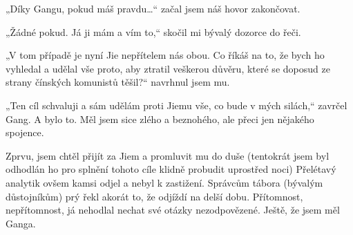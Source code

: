 „Díky Gangu, pokud máš pravdu…“ začal jsem náš hovor zakončovat.

„Žádné pokud. Já ji mám a vím to,“ skočil mi bývalý dozorce do řeči.

„V tom případě je nyní Jie nepřítelem nás obou. Co říkáš na to, že bych ho vyhledal a udělal vše proto, aby ztratil veškerou důvěru, které se doposud ze strany čínských komunistů těšil?“ navrhnul jsem mu.

„Ten cíl schvaluji a sám udělám proti Jiemu vše, co bude v mých silách,“ zavrčel Gang. A bylo to. Měl jsem sice zlého a beznohého, ale přeci jen nějakého spojence.

Zprvu, jsem chtěl přijít za Jiem a promluvit mu do duše (tentokrát jsem byl odhodlán ho pro splnění tohoto cíle klidně probudit uprostřed noci) Přelétavý analytik ovšem kamsi odjel a nebyl k zastižení. Správcům tábora (bývalým důstojníkům) prý řekl akorát to, že odjíždí na delší dobu. Přítomnost, nepřítomnost, já nehodlal nechat své otázky nezodpovězené. Ještě, že jsem měl Ganga.
